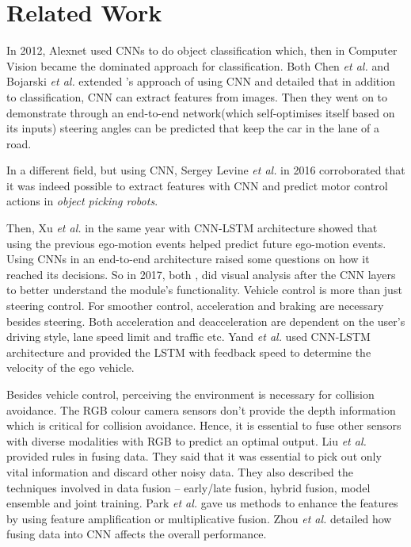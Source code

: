 \section{Related Work}
In 2012, Alexnet \cite{Alexnet2012} used CNNs to do object classification which, then
in Computer Vision became the dominated approach for classification. Both Chen \textit{et
al.} \cite{chen2017} and Bojarski \textit{et al.} \cite{bojarski2016end} extended
\cite{Alexnet2012}'s approach of using CNN and detailed that in addition to classification, CNN can
extract features from images. Then they went on to demonstrate through an end-to-end
network(which self-optimises itself based on its inputs) steering angles can be predicted that keep the car in the
lane of a road. 

In a different field, but using CNN, Sergey Levine \textit{et al.} 
\cite{GooglePaperonCNNActuation} in 2016 corroborated that it was indeed possible to extract
features with CNN and predict motor control actions in \textit{object picking robots}.

Then, Xu \textit{et al.} \cite{XuGYD16CNNLSTM} in the same year with CNN-LSTM architecture
showed that using the previous ego-motion events helped predict future ego-motion events. 
Using CNNs in an end-to-end architecture raised some questions on how it reached its
decisions. So in 2017, both \cite{heatmapsLearning}, \cite{BojarskiCNN1} did visual
analysis after the CNN layers to better understand the module's functionality. 
Vehicle control is more than just steering control. For smoother control, acceleration and
braking are necessary besides steering. Both acceleration and deacceleration are dependent on  the user's driving
style, lane speed limit and traffic etc. Yand \textit{et
al.} \cite{E2EMultimodalDiscreteSpeed} used CNN-LSTM architecture and provided the LSTM
with feedback speed to determine the velocity of the ego vehicle.

Besides vehicle control, perceiving the environment is necessary for collision avoidance. 
The RGB colour camera sensors don't provide the depth information which is critical for collision avoidance. 
Hence, it is essential to fuse other sensors with diverse modalities with RGB to predict an optimal output. 
Liu \textit{et al.} \cite{liu2018learn} provided rules in fusing data. They said that it was
essential to pick out only vital information and discard other noisy data. 
They also described the techniques involved in data fusion -- early/late
fusion, hybrid fusion, model ensemble and joint training. Park \textit{et
al.} \cite{ParkHBB16} gave us methods to enhance the features by using feature amplification
or multiplicative fusion. Zhou \textit{et al.} \cite{ZhouSideChannel} detailed how fusing
data into CNN affects the overall performance.  

